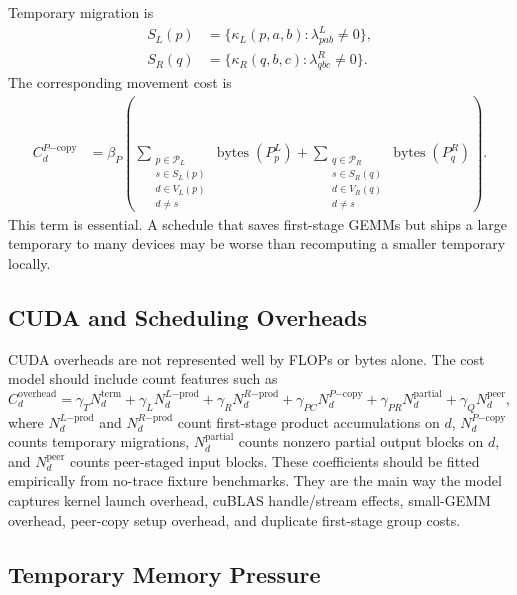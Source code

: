 \documentclass[11pt]{article}
\begin{document}
Temporary migration is
\begin{align}
  S_L(p) &=
    \{ \kappa_L(p,a,b) : \lambda^L_{pab}\ne 0 \},\\
  S_R(q) &=
    \{ \kappa_R(q,b,c) : \lambda^R_{qbc}\ne 0 \}.
\end{align}
The corresponding movement cost is
\begin{align}
  C^{P\mathrm{-copy}}_d &=
  \beta_P
  \left(
    \sum_{\substack{p\in \mathcal{P}_L\\s\in S_L(p)\\d\in V_L(p)\\d\ne s}}
      \operatorname{bytes}(P^L_p)
    +
    \sum_{\substack{q\in \mathcal{P}_R\\s\in S_R(q)\\d\in V_R(q)\\d\ne s}}
      \operatorname{bytes}(P^R_q)
  \right).
\end{align}
This term is essential.  A schedule that saves first-stage GEMMs but ships a
large temporary to many devices may be worse than recomputing a smaller
temporary locally.

\subsection{CUDA and Scheduling Overheads}

CUDA overheads are not represented well by FLOPs or bytes alone.  The cost
model should include count features such as
\begin{equation}
  C^{\mathrm{overhead}}_d =
    \gamma_T N^{\mathrm{term}}_d
  + \gamma_L N^{L\mathrm{-prod}}_d
  + \gamma_R N^{R\mathrm{-prod}}_d
  + \gamma_{PC} N^{P\mathrm{-copy}}_d
  + \gamma_{PR} N^{\mathrm{partial}}_d
  + \gamma_Q N^{\mathrm{peer}}_d,
\end{equation}
where $N^{L\mathrm{-prod}}_d$ and $N^{R\mathrm{-prod}}_d$ count first-stage
product accumulations on $d$, $N^{P\mathrm{-copy}}_d$ counts temporary
migrations, $N^{\mathrm{partial}}_d$ counts nonzero partial output blocks on
$d$, and $N^{\mathrm{peer}}_d$ counts peer-staged input blocks.  These
coefficients should be fitted empirically from no-trace fixture benchmarks.
They are the main way the model captures kernel launch overhead, cuBLAS
handle/stream effects, small-GEMM overhead, peer-copy setup overhead, and
duplicate first-stage group costs.

\subsection{Temporary Memory Pressure}
\end{document}
